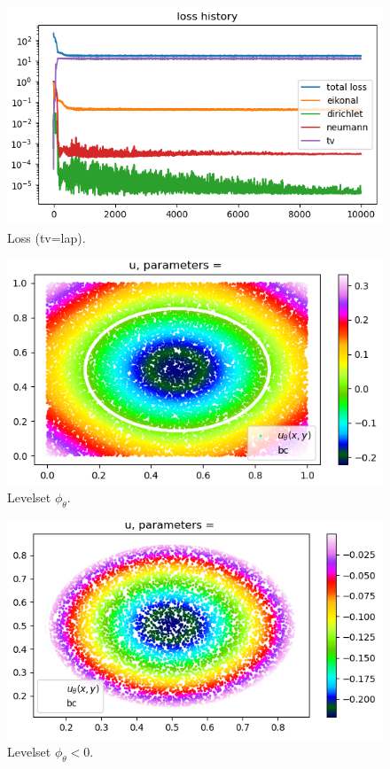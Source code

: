 \documentclass[french]{article}
\begin{document}
	\begin{minipage}{0.33\linewidth}
		\begin{figure}[H]
			\centering
			\includegraphics[width=\linewidth]{"levelset/circle/loss_circle.png"}
			\caption{Loss (tv=lap).}
		\end{figure}
	\end{minipage}
	\begin{minipage}{0.33\linewidth}
		\begin{figure}[H]
			\centering
			\includegraphics[width=\linewidth]{"levelset/circle/sol_circle.png"}
			\caption{Levelset $\phi_\theta$.}
		\end{figure}
	\end{minipage}
	\begin{minipage}{0.33\linewidth}
		\begin{figure}[H]
			\centering
			\includegraphics[width=\linewidth]{"levelset/circle/sol_mask_circle.png"}
			\caption{Levelset $\phi_\theta<0$.}
		\end{figure}
	\end{minipage}
\end{document}

